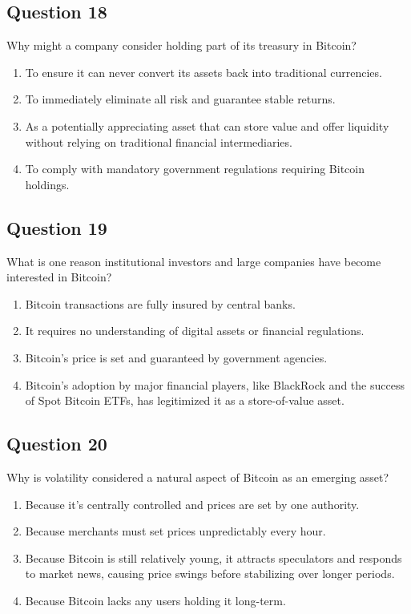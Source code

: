 \documentclass[12pt,a4paper]{article}
\begin{document}
\bigskip


\subsection*{Question 18}
Why might a company consider holding part of its treasury in Bitcoin?

\begin{enumerate}[label=\Alph*., leftmargin=*]
\item To ensure it can never convert its assets back into traditional currencies.
\item To immediately eliminate all risk and guarantee stable returns.
\item As a potentially appreciating asset that can store value and offer liquidity without relying on traditional financial intermediaries.
\item To comply with mandatory government regulations requiring Bitcoin holdings.
\end{enumerate}

\bigskip


\subsection*{Question 19}
What is one reason institutional investors and large companies have become interested in Bitcoin?

\begin{enumerate}[label=\Alph*., leftmargin=*]
\item Bitcoin transactions are fully insured by central banks.
\item It requires no understanding of digital assets or financial regulations.
\item Bitcoin’s price is set and guaranteed by government agencies.
\item Bitcoin’s adoption by major financial players, like BlackRock and the success of Spot Bitcoin ETFs, has legitimized it as a store-of-value asset.
\end{enumerate}

\bigskip


\subsection*{Question 20}
Why is volatility considered a natural aspect of Bitcoin as an emerging asset?

\begin{enumerate}[label=\Alph*., leftmargin=*]
\item Because it’s centrally controlled and prices are set by one authority.
\item Because merchants must set prices unpredictably every hour.
\item Because Bitcoin is still relatively young, it attracts speculators and responds to market news, causing price swings before stabilizing over longer periods.
\item Because Bitcoin lacks any users holding it long-term.
\end{enumerate}
\end{document}
